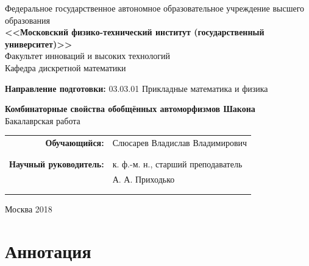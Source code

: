 \documentclass[14pt, a4paper, russian]{report}
\begin{document}
\begin{center}
\hfill \break
\footnotesize{Федеральное государственное автономное образовательное учреждение 
высшего образования}\\ 
\small{\textbf{<<Московский физико-технический институт (государственный университет)>>}}\\
\hfill \break
\normalsize{Факультет инноваций и высоких технологий}\\
\normalsize{Кафедра дискретной математики}\\
\end{center}
\footnotesize{\textbf{Направление подготовки:} 03.03.01 Прикладные математика и физика}\\
\hfill \break
\hfill \break
\hfill \break
\hfill \break
\begin{center}
\large{\textbf{Комбинаторные свойства обобщённых автоморфизмов Шакона}}\\
\normalsize{Бакалаврская работа}\\
\hfill \break
\hfill \break
\end{center}
 
\hfill \break
 
\begin{flushright}
\footnotesize{ 
\begin{tabular}{rl}
\textbf{Обучающийся:} & Слюсарев Владислав Владимирович \\
 & \underline{\hspace{3cm}} \\\\
\textbf{Научный руководитель:} & к. ф.-м. н., старший преподаватель\\
            & А. А. Приходько \\
 & \underline{\hspace{3cm}} \\\\
\end{tabular}
}
\end{flushright}

\hfill \break
\hfill \break
\hfill \break
\hfill \break
\hfill \break
\hfill \break
\begin{center} Москва 2018 \end{center}
\thispagestyle{empty} %
 
 
\newpage

\chapter*{Аннотация}
\end{document}
